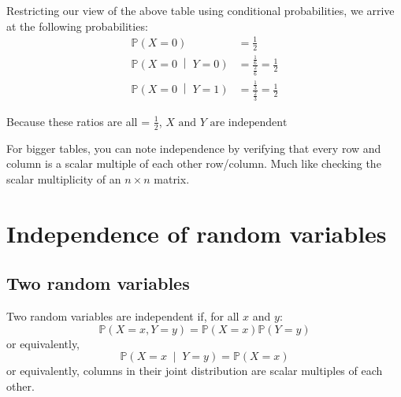 \documentclass[titlepage, 12pt, leqno]{article}
\begin{document}
\begin{ex}
    Restricting our view of the above table using conditional probabilities, we
    arrive at the following probabilities:
   \begin{align*}
       \mathbb{P}(X=0) &= \frac{1}{2} \\
       \mathbb{P}\left(X=0 \;\middle|\; Y=0\right) &= \frac{\frac{1}{6}
       }{\frac{2}{6}} = \frac{1}{2} \\
       \mathbb{P}\left(X=0 \;\middle|\; Y=1\right) &= \frac{\frac{1}{3}
       }{\frac{2}{3}} = \frac{1}{2} 
   \end{align*}

   Because these ratios are all = $\frac{1}{2}$, $\boxed{X \text{ and } Y \text{ 
   are independent}}$
\end{ex}

\begin{note}
    For bigger tables, you can note independence by verifying that every row and
    column is a scalar multiple of each other row/column. Much like checking the
    scalar multiplicity of an $n \times n$ matrix.
\end{note}

\pagebreak
\section{Independence of random variables}
\subsection{Two random variables}
Two random variables are independent if, for all $x$ and $y$:
\[
\mathbb{P}(X=x, Y=y) = \mathbb{P}(X=x)\mathbb{P}(Y=y)
\]
or equivalently,
\[
\mathbb{P}\left(X = x \;\middle|\; Y = y\right) = \mathbb{P}(X=x)
\]
or equivalently, columns in their joint distribution are scalar multiples of
each other.
\end{document}

